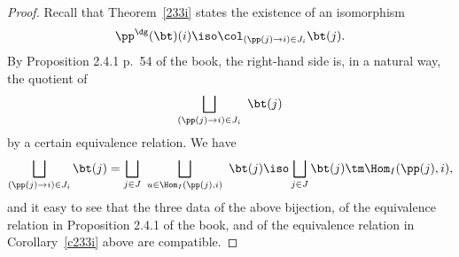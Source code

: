 \documentclass[12pt]{article}
\theoremstyle{remark}
\theoremstyle{definition}
\begin{document}
\begin{proof}
Recall that Theorem~\ref{233i} states the existence of an isomorphism 
$$
\pp^\dg(\bt)(i)\iso\col_{(\pp(j)\to i)\in J_i}\bt(j).
$$
By Proposition 2.4.1 p.~54 of the book, the right-hand side is, in a natural way, the quotient of 
$$
\bigsqcup_{(\pp(j)\to i)\in J_i}\ \bt(j)
$$ 
by a certain equivalence relation. We have 
$$
\bigsqcup_{(\pp(j)\to i)\in J_i}\bt(j)=\bigsqcup_{j\in J}\ \bigsqcup_{u\in\Hom_I(\pp(j),i)}\ \bt(j)\iso\bigsqcup_{j\in J}\bt(j)\tm\Hom_I(\pp(j),i),
$$ 
and it easy to see that the three data of the above bijection, of the equivalence relation in Proposition 2.4.1 of the book, and of the equivalence relation in Corollary~\ref{c233i} above are compatible.
\end{proof}


\end{document}
